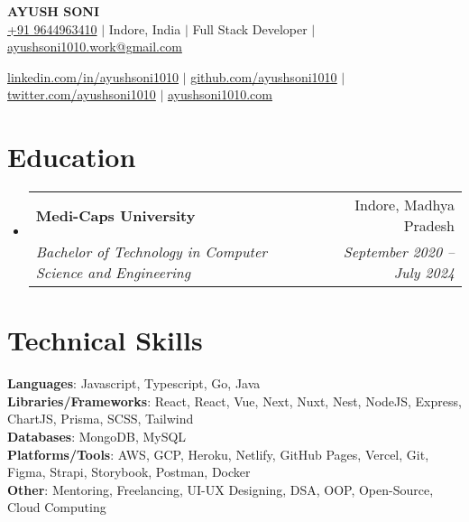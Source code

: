 \documentclass[letterpaper,11pt]{article}
\makeatletter
\newcommand{\resumeSubheading}[4]{
    \vspace{-2pt}\item
      \begin{tabular*}{0.97\textwidth}[t]{l@{\extracolsep{\fill}}r}
        \textbf{#1} & #2 \\
        \textit{\small#3} & \textit{\small #4} \\
      \end{tabular*}\vspace{-7pt}
  }
\newcommand{\resumeSubHeadingListStart}{\begin{itemize}[leftmargin=0.15in, label={}]}
\newcommand{\resumeSubHeadingListEnd}{\end{itemize}}
\makeatother
\begin{document}

\begin{center}
  \textbf{\Huge \scshape AYUSH SONI} \\ \vspace{1pt}
  \href{tel:9644963410}{+91 9644963410} $|$
  {Indore, India} $|$
  {Full Stack Developer} $|$
  \href{mailto:ayushsoni1010.work@gmail.com}{ayushsoni1010.work@gmail.com} \\ \vspace{1pt}

  \href{https://linkedin.com/in/ayushsoni1010}{\underline{linkedin.com/in/ayushsoni1010}} $|$
  \href{https://github.com/ayushsoni1010}{\underline{github.com/ayushsoni1010}} $|$
  \href{https://twitter.com/ayushsoni1010}{\underline{twitter.com/ayushsoni1010}} $|$
  \href{ayushsoni1010.com}{\underline{ayushsoni1010.com}}
\end{center}

\section{Education}
\resumeSubHeadingListStart
\resumeSubheading
{Medi-Caps University}{Indore, Madhya Pradesh}
{Bachelor of Technology in Computer Science and Engineering}{September 2020 -- July 2024}
\resumeSubHeadingListEnd


\section{Technical Skills}
\begin{itemize}[leftmargin=0.15in, label={}]
  \small{\item{
        \textbf{Languages}{: Javascript, Typescript, Go, Java } \\
        \textbf{Libraries/Frameworks}{: React, React, Vue, Next, Nuxt, Nest, NodeJS, Express, ChartJS, Prisma, SCSS, Tailwind} \\
        \textbf{Databases}{: MongoDB, MySQL} \\
        \textbf{Platforms/Tools}{: AWS, GCP, Heroku, Netlify, GitHub Pages, Vercel, Git, Figma, Strapi, Storybook, Postman, Docker } \\
        \textbf{Other}{: Mentoring, Freelancing, UI-UX Designing, DSA, OOP, Open-Source, Cloud Computing}
        }}
\end{itemize}


\end{document}

